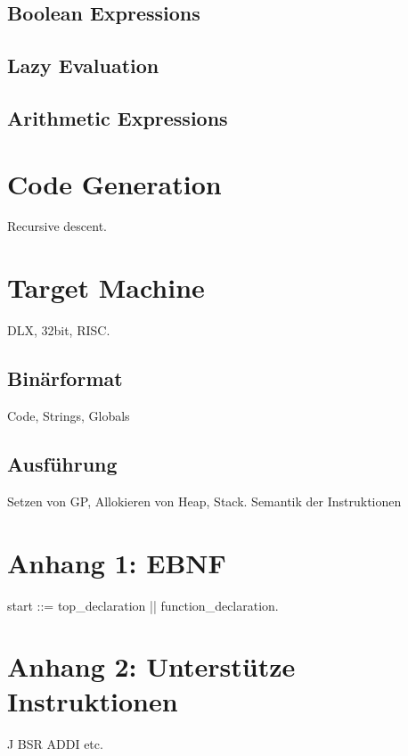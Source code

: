 \documentclass{article}
\begin{document}
	\subsection{Boolean Expressions}

	\subsection{Lazy Evaluation}

	\subsection{Arithmetic Expressions}

	\section{Code Generation}
	Recursive descent.

	\section{Target Machine}
	DLX, 32bit, RISC.

	\subsection{Binärformat}
	Code, Strings, Globals

	\subsection{Ausführung}
	Setzen von GP, Allokieren von Heap, Stack. Semantik der Instruktionen

	\newpage
	\section{Anhang 1: EBNF}
	start ::= top\_declaration || function\_declaration.

	\newpage
	\section{Anhang 2: Unterstütze Instruktionen}
	J
	BSR
	ADDI
	etc.
\end{document}
